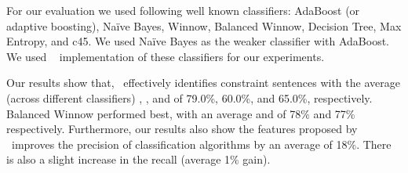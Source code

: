 For our evaluation we used following well known classifiers: AdaBoost (or adaptive boosting), Na{\"i}ve Bayes, Winnow, Balanced Winnow, Decision Tree, Max Entropy, and c45. We used Na{\"i}ve Bayes as the weaker classifier with AdaBoost. We used ~\cite{mallet} implementation of these classifiers for our experiments.

Our results show that, \tool\ effectively identifies constraint sentences with the average (across different classifiers) , , and  of 79.0\%, 60.0\%, and 65.0\%, respectively.
Balanced Winnow performed best, with an average  and  of 78\% and 77\% respectively. 
Furthermore, our results also show the features proposed by \tool\ improves the precision of classification algorithms by an average of 18\%. There is also a slight increase in the recall (average 1\% gain). 

 

%
%
%
%
 
